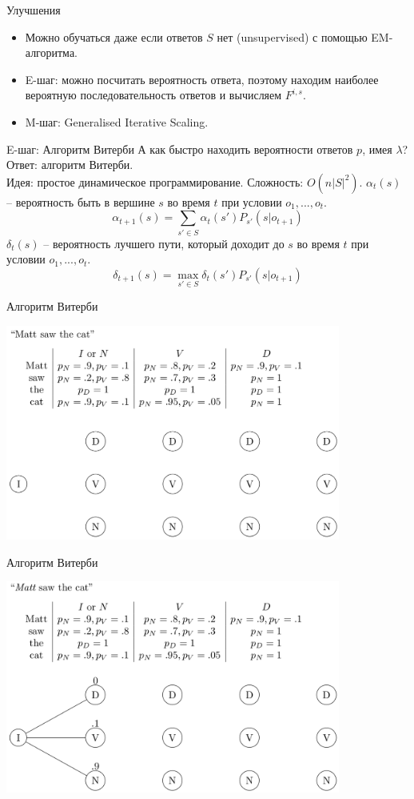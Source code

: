 \documentclass{beamer}
\begin{document}
\begin{frame}{Улучшения}
\begin{itemize}
\item Можно обучаться даже если ответов $S$ нет (unsupervised) с помощью EM-алгоритма.
\item E-шаг: можно посчитать вероятность ответа, поэтому находим наиболее вероятную последовательность ответов и вычисляем $F^{i,s}$.
\item M-шаг: Generalised Iterative Scaling.
\end{itemize}
\end{frame}

\begin{frame}{E-шаг: Алгоритм Витерби}
А как быстро находить вероятности ответов $p$, имея $\lambda$?\\
Ответ: алгоритм Витерби.\\
Идея: простое динамическое программирование. Сложность: $O(n|S|^2)$.
$\alpha_t(s)$ -- вероятность быть в вершине $s$ во время $t$ при условии $o_1, ..., o_t$.
$$\alpha_{t+1}(s) = \sum_{s' \in S} \alpha_t(s')P_{s'}(s|o_{t+1})$$
$\delta_t(s)$ -- вероятность лучшего пути, который доходит до $s$ во время $t$ при условии $o_1,...,o_t$.
$$\delta_{t+1}(s) = \max_{s' \in S} \delta_t(s') P_{s'}(s|o_{t+1})$$
\end{frame}

\begin{frame}{Алгоритм Витерби}
\centerline{\includegraphics[width=11cm]{fig/1.png}}
\end{frame}

\begin{frame}{Алгоритм Витерби}
\centerline{\includegraphics[width=11cm]{fig/2.png}}
\end{frame}
\end{document}
